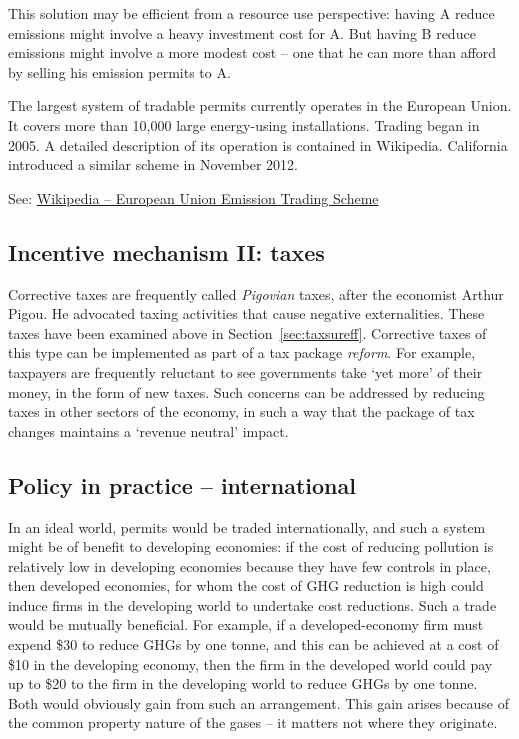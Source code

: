 This solution may be efficient from a resource use perspective: having A reduce emissions might involve a heavy investment cost for A. But having B reduce emissions might involve a more modest cost -- one that he can more than afford by selling his emission permits to A.

The largest system of tradable permits currently operates in the European Union. It covers more than 10,000 large energy-using installations. Trading began in 2005. A detailed description of its operation is contained in Wikipedia. California introduced a similar scheme in November 2012.

See: \href{http://en.wikipedia.org/wiki/European\_Union\_Emission\_Trading\_Scheme}{Wikipedia -- European Union Emission Trading Scheme}

\subsection*{Incentive mechanism II: taxes}

Corrective taxes are frequently called \textit{Pigovian} taxes, after the economist Arthur Pigou. He advocated taxing activities that cause negative externalities. These taxes have been examined above in Section~\ref{sec:taxsureff}. Corrective taxes of this type can be implemented as part of a tax package \textit{reform}. For example, taxpayers are frequently reluctant to see governments take `yet more' of their money, in the form of new taxes. Such concerns can be addressed by reducing taxes in other sectors of the economy, in such a way that the package of tax changes maintains a `revenue neutral' impact. 

\subsection*{Policy in practice -- international}

In an ideal world, permits would be traded internationally, and such a system might be of benefit to developing economies: if the cost of reducing pollution is relatively low in developing economies because they have few controls in place, then developed economies, for whom the cost of GHG reduction is high could induce firms in the developing world to undertake cost reductions.  Such a trade would be mutually beneficial. For example, if a developed-economy firm must expend \$30 to reduce GHGs by one tonne, and this can be achieved at a cost of \$10 in the developing economy, then the firm in the developed world could pay up to \$20 to the firm in the developing world to reduce GHGs by one tonne. Both would obviously gain from such an arrangement. This gain arises because of the common property nature of the gases -- it matters not where they originate.


